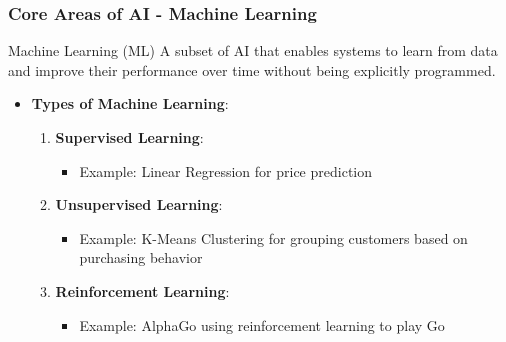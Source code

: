 \documentclass[aspectratio=169]{beamer}
\begin{document}
\begin{frame}[fragile]
    \frametitle{Core Areas of AI - Machine Learning}
    \begin{block}{Machine Learning (ML)}
        A subset of AI that enables systems to learn from data and improve their performance over time without being explicitly programmed.
    \end{block}
    \begin{itemize}
        \item \textbf{Types of Machine Learning}:
        \begin{enumerate}
            \item \textbf{Supervised Learning}:
                \begin{itemize}
                    \item Example: Linear Regression for price prediction
                \end{itemize}
            \item \textbf{Unsupervised Learning}:
                \begin{itemize}
                    \item Example: K-Means Clustering for grouping customers based on purchasing behavior
                \end{itemize}
            \item \textbf{Reinforcement Learning}:
                \begin{itemize}
                    \item Example: AlphaGo using reinforcement learning to play Go
                \end{itemize}
        \end{enumerate}
    \end{itemize}
\end{frame}
\end{document}
